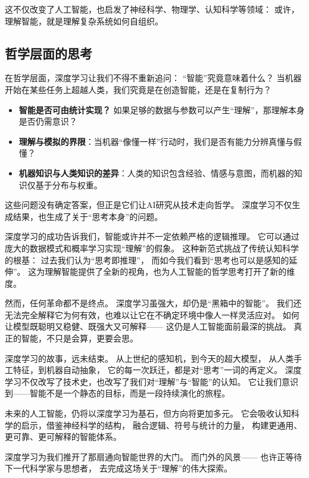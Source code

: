 这不仅改变了人工智能，也启发了神经科学、物理学、认知科学等领域：  
或许，理解智能，就是理解复杂系统如何自组织。

\subsection{哲学层面的思考}

在哲学层面，深度学习让我们不得不重新追问：  
“智能”究竟意味着什么？  
当机器开始在某些任务上超越人类，我们究竟是在创造智能，还是在复制行为？  

\begin{itemize}
\item \textbf{智能是否可由统计实现？}  
如果足够的数据与参数可以产生“理解”，那理解本身是否仍需意识？
\item \textbf{理解与模拟的界限}：当机器“像懂一样”行动时，我们是否有能力分辨真懂与假懂？
\item \textbf{机器知识与人类知识的差异}：人类的知识包含经验、情感与意图，而机器的知识仅基于分布与权重。
\end{itemize}

这些问题没有确定答案，但正是它们让AI研究从技术走向哲学。  
深度学习不仅生成结果，也生成了关于“思考本身”的问题。

深度学习的成功告诉我们，智能或许并不一定依赖严格的逻辑推理。  
它可以通过庞大的数据模式和概率学习实现“理解”的假象。  
这种新范式挑战了传统认知科学的根基：  
过去我们认为“思考即推理”，  
而如今我们看到“思考也可以是感知的延伸”。  
这为理解智能提供了全新的视角，也为人工智能的哲学思考打开了新的维度。

然而，任何革命都不是终点。  
深度学习虽强大，却仍是“黑箱中的智能”。  
我们还无法完全解释它为何有效，也难以让它在不确定环境中像人一样灵活应对。  
如何让模型既聪明又稳健、既强大又可解释——  
这仍是人工智能面前最深的挑战。  
真正的智能，不只是会算，更要会思。

深度学习的故事，远未结束。  
从上世纪的感知机，到今天的超大模型，  
从人类手工特征，到机器自动抽象，  
它的每一次跃迁，都是对“思考”一词的再定义。  
深度学习不仅改写了技术史，也改写了我们对“理解”与“智能”的认知。  
它让我们意识到——智能不是一个静态的目标，而是一段持续演化的旅程。

未来的人工智能，仍将以深度学习为基石，但方向将更加多元。  
它会吸收认知科学的启示，借鉴神经科学的结构，  
融合逻辑、符号与统计的力量，  
构建更通用、更可靠、更可解释的智能体系。  

深度学习为我们推开了那扇通向智能世界的大门。  
而门外的风景——  
也许正等待下一代科学家与思想者，  
去完成这场关于“理解”的伟大探索。

